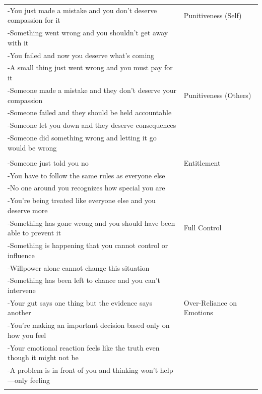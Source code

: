 \documentclass[11pt,oneside]{book}
\begin{document}
\begin{longtable}{>{\raggedright\arraybackslash}p{} >{\raggedright\arraybackslash}p{}}
-You just made a mistake and you don't deserve compassion for it & Punitiveness (Self) \\
-Something went wrong and you shouldn't get away with it &  \\
-You failed and now you deserve what's coming &  \\
-A small thing just went wrong and you must pay for it &  \\
\addlinespace

-Someone made a mistake and they don't deserve your compassion & Punitiveness (Others) \\
-Someone failed and they should be held accountable &  \\
-Someone let you down and they deserve consequences &  \\
-Someone did something wrong and letting it go would be wrong &  \\

\midrule
\multicolumn{2}{l}{\textbf{Realistic \& Consistent Limits}} \\
\midrule

-Someone just told you no & Entitlement \\
-You have to follow the same rules as everyone else &  \\
-No one around you recognizes how special you are &  \\
-You're being treated like everyone else and you deserve more &  \\
\addlinespace

-Something has gone wrong and you should have been able to prevent it & Full Control \\
-Something is happening that you cannot control or influence &  \\
-Willpower alone cannot change this situation &  \\
-Something has been left to chance and you can't intervene &  \\
\addlinespace

-Your gut says one thing but the evidence says another & Over-Reliance on Emotions \\
-You're making an important decision based only on how you feel &  \\
-Your emotional reaction feels like the truth even though it might not be &  \\
-A problem is in front of you and thinking won't help---only feeling &  \\

\midrule
\multicolumn{2}{l}{\textbf{Coherence \& Fairness}} \\
\midrule


\end{longtable}
\end{document}
